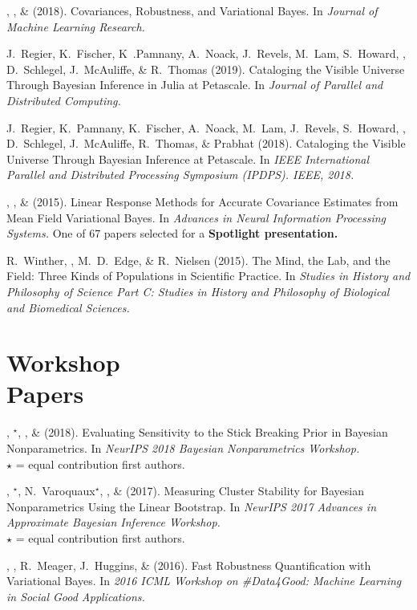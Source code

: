 \me, \tamara, \& \mike (2018).  Covariances, Robustness, and Variational Bayes.
In \emph{Journal of Machine Learning Research.}

J.~Regier, K.~Fischer, K~.Pamnany, A.~Noack, J.~Revels, M.~Lam, S.~Howard,
\me, D.~Schlegel, J.~McAuliffe, \& R.~Thomas (2019). Cataloging the Visible
Universe Through Bayesian Inference in Julia at Petascale. In \emph{Journal of
Parallel and Distributed Computing.}

J.~Regier, K.~Pamnany, K.~Fischer, A.~Noack, M.~Lam, J.~Revels, S.~Howard, \me,
D.~Schlegel, J.~McAuliffe, R.~Thomas, \& Prabhat (2018).  Cataloging the Visible
Universe Through Bayesian Inference at Petascale.  In \emph{IEEE International
Parallel and Distributed Processing Symposium (IPDPS). IEEE, 2018.}

\me, \tamara, \& \mike (2015). Linear Response Methods for Accurate Covariance
Estimates from Mean Field Variational Bayes. In \emph{Advances in Neural
Information Processing Systems.}
One of 67 papers selected for a \textbf{Spotlight presentation.}

R.~Winther, \me, M.~D.~Edge, \& R.~Nielsen (2015).  The Mind, the Lab, and the
Field: Three Kinds of Populations in Scientific Practice.  In \emph{Studies in
History and Philosophy of Science Part C: Studies in History and Philosophy of
Biological and Biomedical Sciences.}


\section{\sc Workshop \\ Papers}

\mestar, \runjing{}$^\star$, \mike, \& \tamara (2018).
Evaluating Sensitivity to the Stick Breaking Prior in Bayesian Nonparametrics.
In \emph{NeurIPS 2018 Bayesian Nonparametrics Workshop.}\\
$\star$ = equal contribution first authors.

\mestar, \runjing{}$^\star$, N.~Varoquaux$^\star$, \mike, \& \tamara (2017).
Measuring Cluster Stability for Bayesian Nonparametrics Using the Linear Bootstrap.
In \emph{NeurIPS 2017 Advances in Approximate Bayesian Inference Workshop.}\\
$\star$ = equal contribution first authors.

\me, \tamara, R.~Meager, J.~Huggins, \& \mike (2016). Fast Robustness
Quantification with Variational Bayes. In \emph{2016 ICML Workshop on
\#Data4Good: Machine Learning in Social Good Applications.}
